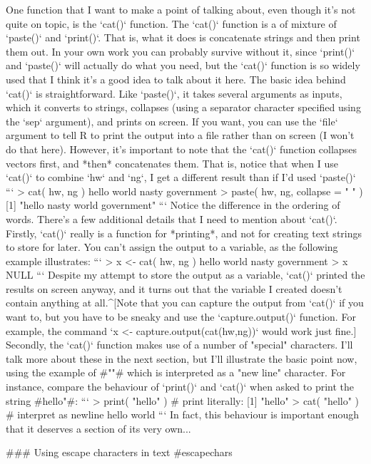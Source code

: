 One function that I want to make a point of talking about, even though it's not quite on topic, is the `cat()` function. The `cat()` function is a of mixture of  `paste()` and `print()`. That is, what it does is concatenate strings and then print them out. In your own work you can probably survive without it, since `print()` and `paste()` will actually do what you need, but the `cat()` function is so widely used that I think it's a good idea to talk about it here. The basic idea behind `cat()` is straightforward. Like `paste()`, it takes several arguments as inputs, which it converts to strings, collapses (using a separator character specified using the `sep` argument), and prints on screen. If you want, you can use the `file` argument to tell R to print the output into a file rather than on screen (I won't do that here). However, it's important to note that the `cat()` function collapses vectors first, and *then* concatenates them. That is, notice that when I use `cat()` to combine `hw` and `ng`, I get a different result than if I'd used `paste()`
```
> cat( hw, ng )
hello world nasty government
> paste( hw, ng, collapse = " " )
[1] "hello nasty world government"
``` 
Notice the difference in the ordering of words. There's a few additional details that I need to mention about `cat()`. Firstly, `cat()` really is a function for *printing*, and not for creating text strings to store for later. You can't assign the output to a variable, as the following example illustrates:
```
> x <- cat( hw, ng )   
hello world nasty government
> x  
NULL
```
Despite my attempt to store the output as a variable, `cat()` printed the results on screen anyway, and it turns out that the variable I created doesn't contain anything at all.^[Note that you can capture the output from `cat()` if you want to, but you have to be sneaky and use the `capture.output()` function. For example, the command `x <- capture.output(cat(hw,ng))` would work just fine.] Secondly, the `cat()` function makes use of a number of "special" characters. I'll talk more about these in the next section, but I'll illustrate the basic point now, using the example of \rtextverb#"\n"# which is interpreted as a "new line" character. For instance, compare the behaviour of `print()` and `cat()` when asked to print the string \rtextverb#hello\nworld"#:
```
> print( "hello\nworld" )  # print literally:
[1] "hello\nworld"
> cat( "hello\nworld" )  # interpret as newline
hello
world
```
In fact, this behaviour is important enough that it deserves a section of its very own...

### Using escape characters in text {#escapechars}


